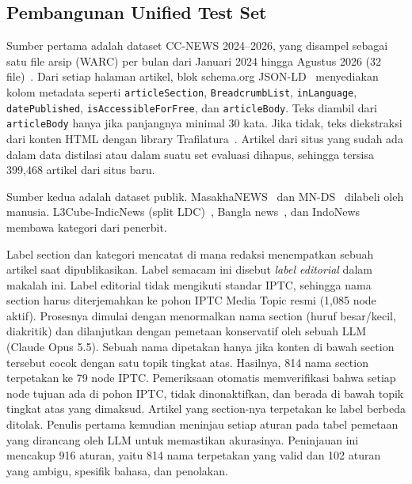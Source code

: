 \documentclass[journal]{IEEEtran}
\begin{document}
\subsection{Pembangunan Unified Test Set}
\label{sec:testset}
Sumber pertama adalah dataset CC-NEWS 2024--2026, yang disampel sebagai satu file arsip (WARC) per bulan dari Januari 2024 hingga Agustus 2026 (32 file)~\cite{commoncrawl2026ccnews}. Dari setiap halaman artikel, blok schema.org JSON-LD~\cite{guha2016schema} menyediakan kolom metadata seperti \texttt{articleSection}, \texttt{BreadcrumbList}, \texttt{inLanguage}, \texttt{datePublished}, \texttt{isAccessibleForFree}, dan \texttt{articleBody}. Teks diambil dari \texttt{articleBody} hanya jika panjangnya minimal 30 kata. Jika tidak, teks diekstraksi dari konten HTML dengan library Trafilatura~\cite{barbaresi2021trafilatura}. Artikel dari situs yang sudah ada dalam data distilasi atau dalam suatu set evaluasi dihapus, sehingga tersisa 399,468 artikel dari situs baru.

Sumber kedua adalah dataset publik. MasakhaNEWS~\cite{adelani2023masakhanews} dan MN-DS~\cite{petukhova2023mnds} dilabeli oleh manusia. L3Cube-IndicNews (split LDC)~\cite{mirashi2023indicnews}, Bangla news~\cite{hossain2025banglanews}, dan IndoNews~\cite{indonews2021} membawa kategori dari penerbit.

Label section dan kategori mencatat di mana redaksi menempatkan sebuah artikel saat dipublikasikan. Label semacam ini disebut \emph{label editorial} dalam makalah ini. Label editorial tidak mengikuti standar IPTC, sehingga nama section harus diterjemahkan ke pohon IPTC Media Topic resmi (1,085 node aktif). Prosesnya dimulai dengan menormalkan nama section (huruf besar/kecil, diakritik) dan dilanjutkan dengan pemetaan konservatif oleh sebuah LLM (Claude Opus 5.5). Sebuah nama dipetakan hanya jika konten di bawah section tersebut cocok dengan satu topik tingkat atas. Hasilnya, 814 nama section terpetakan ke 79 node IPTC. Pemeriksaan otomatis memverifikasi bahwa setiap node tujuan ada di pohon IPTC, tidak dinonaktifkan, dan berada di bawah topik tingkat atas yang dimaksud. Artikel yang section-nya terpetakan ke label berbeda ditolak. Penulis pertama kemudian meninjau setiap aturan pada tabel pemetaan yang dirancang oleh LLM untuk memastikan akurasinya. Peninjauan ini mencakup 916 aturan, yaitu 814 nama terpetakan yang valid dan 102 aturan yang ambigu, spesifik bahasa, dan penolakan.
\end{document}
